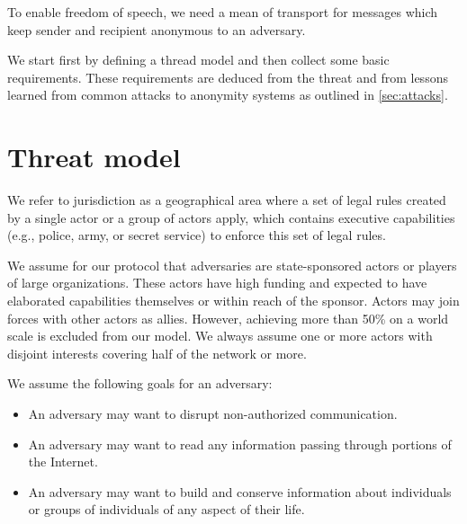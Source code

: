 To enable freedom of speech, we need a mean of transport for messages which keep sender and recipient anonymous to an adversary.

We start first by defining a thread model and then collect some basic requirements. These requirements are deduced from the threat and from lessons learned from common attacks to anonymity systems as outlined in \ref{sec:attacks}.

\section{Threat model\label{sec:adversary}}
We refer to jurisdiction as a geographical area where a set of legal rules created by a single actor or a group of actors apply, which contains executive capabilities (e.g., police, army, or secret service) to enforce this set of legal rules.

We assume for our protocol that adversaries are state-sponsored actors or players of large organizations. These actors have high funding and expected to have elaborated capabilities themselves or within reach of the sponsor. Actors may join forces with other actors as allies. However, achieving more than 50\% on a world scale is excluded from our model. We always assume one or more actors with disjoint interests covering half of the network or more. 

We assume the following goals for an adversary:
\begin{itemize}
	\item An adversary may want to disrupt non-authorized communication.
	\item An adversary may want to read any information passing through portions of the Internet.
	\item An adversary may want to build and conserve information about individuals or groups of individuals of any aspect of their life. 
\end{itemize}

